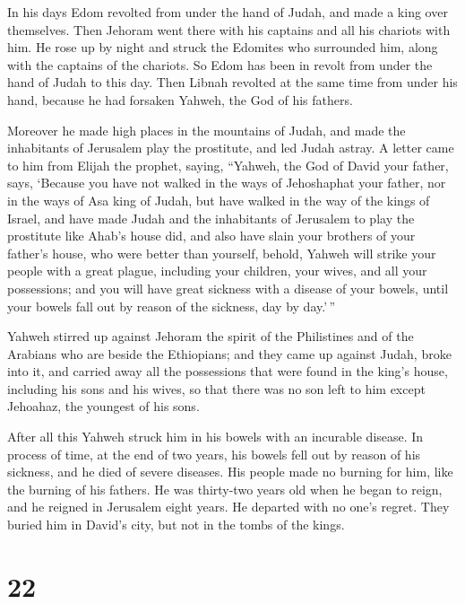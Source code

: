  In his days Edom revolted from under the hand of Judah,
and made a king over themselves.  Then Jehoram went there
with his captains and all his chariots with him. He rose up by night and
struck the Edomites who surrounded him, along with the captains of the
chariots.  So Edom has been in revolt from under the hand
of Judah to this day. Then Libnah revolted at the same time from under
his hand, because he had forsaken Yahweh, the God of his fathers.

 Moreover he made high places in the mountains of Judah,
and made the inhabitants of Jerusalem play the prostitute, and led Judah
astray.  A letter came to him from Elijah the prophet,
saying, ``Yahweh, the God of David your father, says, `Because you have
not walked in the ways of Jehoshaphat your father, nor in the ways of
Asa king of Judah,  but have walked in the way of the
kings of Israel, and have made Judah and the inhabitants of Jerusalem to
play the prostitute like Ahab's house did, and also have slain your
brothers of your father's house, who were better than yourself,
 behold, Yahweh will strike your people with a great
plague, including your children, your wives, and all your possessions;
 and you will have great sickness with a disease of your
bowels, until your bowels fall out by reason of the sickness, day by
day.'\,''

 Yahweh stirred up against Jehoram the spirit of the
Philistines and of the Arabians who are beside the Ethiopians;
 and they came up against Judah, broke into it, and
carried away all the possessions that were found in the king's house,
including his sons and his wives, so that there was no son left to him
except Jehoahaz, the youngest of his sons.

 After all this Yahweh struck him in his bowels with an
incurable disease.  In process of time, at the end of two
years, his bowels fell out by reason of his sickness, and he died of
severe diseases. His people made no burning for him, like the burning of
his fathers.  He was thirty-two years old when he began
to reign, and he reigned in Jerusalem eight years. He departed with no
one's regret. They buried him in David's city, but not in the tombs of
the kings.

\hypertarget{section-21}{%
\section{22}\label{section-21}}

